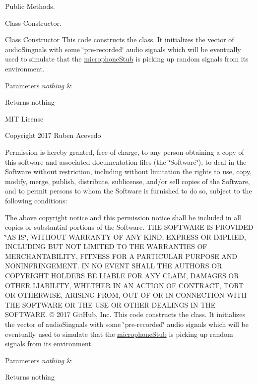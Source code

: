 Public Methods. 

Class Constructor.

Class Constructor This code constructs the class. It initializes the vector of audio\+Singnals with some \char`\"{}pre-\/recorded\char`\"{} audio signals which will be eventually used to simulate that the \hyperlink{classmicrophoneStub}{microphone\+Stub} is picking up random signals from its environment. 
\begin{DoxyParams}{Parameters}
{\em nothing} & \\
\hline
\end{DoxyParams}
\begin{DoxyReturn}{Returns}
nothing
\end{DoxyReturn}
M\+IT License

Copyright 2017 Ruben Acevedo

Permission is hereby granted, free of charge, to any person obtaining a copy of this software and associated documentation files (the \char`\"{}\+Software\char`\"{}), to deal in the Software without restriction, including without limitation the rights to use, copy, modify, merge, publish, distribute, sublicense, and/or sell copies of the Software, and to permit persons to whom the Software is furnished to do so, subject to the following conditions\+:

The above copyright notice and this permission notice shall be included in all copies or substantial portions of the Software. T\+HE S\+O\+F\+T\+W\+A\+RE IS P\+R\+O\+V\+I\+D\+ED \char`\"{}\+A\+S I\+S\char`\"{}, W\+I\+T\+H\+O\+UT W\+A\+R\+R\+A\+N\+TY OF A\+NY K\+I\+ND, E\+X\+P\+R\+E\+SS OR I\+M\+P\+L\+I\+ED, I\+N\+C\+L\+U\+D\+I\+NG B\+UT N\+OT L\+I\+M\+I\+T\+ED TO T\+HE W\+A\+R\+R\+A\+N\+T\+I\+ES OF M\+E\+R\+C\+H\+A\+N\+T\+A\+B\+I\+L\+I\+TY, F\+I\+T\+N\+E\+SS F\+OR A P\+A\+R\+T\+I\+C\+U\+L\+AR P\+U\+R\+P\+O\+SE A\+ND N\+O\+N\+I\+N\+F\+R\+I\+N\+G\+E\+M\+E\+NT. IN NO E\+V\+E\+NT S\+H\+A\+LL T\+HE A\+U\+T\+H\+O\+RS OR C\+O\+P\+Y\+R\+I\+G\+HT H\+O\+L\+D\+E\+RS BE L\+I\+A\+B\+LE F\+OR A\+NY C\+L\+A\+IM, D\+A\+M\+A\+G\+ES OR O\+T\+H\+ER L\+I\+A\+B\+I\+L\+I\+TY, W\+H\+E\+T\+H\+ER IN AN A\+C\+T\+I\+ON OF C\+O\+N\+T\+R\+A\+CT, T\+O\+RT OR O\+T\+H\+E\+R\+W\+I\+SE, A\+R\+I\+S\+I\+NG F\+R\+OM, O\+UT OF OR IN C\+O\+N\+N\+E\+C\+T\+I\+ON W\+I\+TH T\+HE S\+O\+F\+T\+W\+A\+RE OR T\+HE U\+SE OR O\+T\+H\+ER D\+E\+A\+L\+I\+N\+GS IN T\+HE S\+O\+F\+T\+W\+A\+RE. © 2017 Git\+Hub, Inc. This code constructs the class. It initializes the vector of audio\+Singnals with some \char`\"{}pre-\/recorded\char`\"{} audio signals which will be eventually used to simulate that the \hyperlink{classmicrophoneStub}{microphone\+Stub} is picking up random signals from its environment. 
\begin{DoxyParams}{Parameters}
{\em nothing} & \\
\hline
\end{DoxyParams}
\begin{DoxyReturn}{Returns}
nothing 
\end{DoxyReturn}


